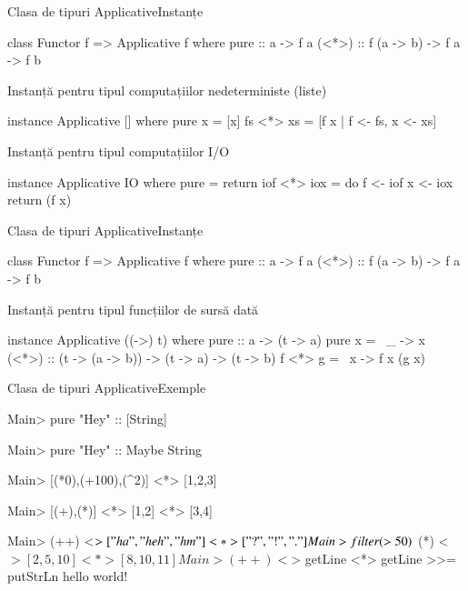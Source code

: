 \documentclass[xcolor=pdftex,romanian,colorlinks]{beamer}
\begin{document}
\begin{frame}[fragile]{Clasa de tipuri Applicative}{Instanțe}
\begin{asciihs}
class Functor f => Applicative f where
   pure :: a -> f a
  (<*>) :: f (a -> b) -> f a -> f b
\end{asciihs}

\begin{block}{Instanță pentru tipul computațiilor nedeterministe (liste)}
\vspace{-2ex}
\begin{asciihs}
instance Applicative [] where
  pure x = [x]
  fs  <*> xs = [f x | f <- fs, x <- xs]
\end{asciihs}
\end{block}

\begin{block}{Instanță pentru tipul computațiilor I/O}
\vspace{-2ex}
\begin{asciihs}
instance Applicative IO where
  pure = return
  iof <*> iox = do
    f <- iof
    x <- iox
    return (f x)
\end{asciihs}
\end{block}
\end{frame}

\begin{frame}[fragile]{Clasa de tipuri Applicative}{Instanțe}
\begin{asciihs}
class Functor f => Applicative f where
   pure :: a -> f a
  (<*>) :: f (a -> b) -> f a -> f b
\end{asciihs}

\begin{block}{Instanță pentru tipul funcțiilor de sursă dată}
\vspace{-2ex}
\begin{asciihs}
instance Applicative ((->) t) where
  pure :: a -> (t -> a)
  pure x = \ _ -> x
  (<*>) :: (t -> (a -> b)) -> (t -> a) -> (t -> b)
  f  <*> g = \ x -> f x (g x)
\end{asciihs}
\end{block}

\end{frame}

\begin{frame}[fragile]{Clasa de tipuri Applicative}{Exemple}
\begin{asciihs}
Main> pure "Hey" :: [String]

Main> pure "Hey" :: Maybe String

Main> [(*0),(+100),(^2)] <*> [1,2,3]

Main> [(+),(*)] <*> [1,2] <*> [3,4]  

Main> (++) <$> ["ha","heh","hm"] <*> ["?","!","."]  

Main> filter (>50) $ (*) <$> [2,5,10] <*> [8,10,11] 

Main> (++) <$> getLine <*> getLine >>= putStrLn 
hello
 world!

\end{asciihs}
\end{frame}
\end{document}
